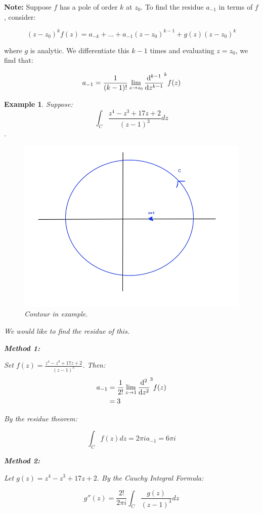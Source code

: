 \documentclass{article}
\newtheorem{ex}{Example}
\theoremstyle{definition}
\begin{document}
\textbf{Note:} Suppose $f$ has a pole of order $k$ at $z_0$. To find the residue $a_{-1}$ in terms of $f$, consider:

$$(z-z_0)^k f(z) = a_{-k}+...+a_{-1}(z-z_0)^{k-1}+ g(z)(z-z_0)^k$$

where $g$ is analytic. We differentiate this $k-1$ times and evaluating $z=z_0$, we find that:

$$a_{-1} = \frac{1}{(k-1)!} \lim_{z \to z_0} \dv{{}^{k-1}}{z^{k-1}} (z-z_0)^k f(z)$$

\begin{ex}
Suppose:
$$\int_C \frac{z^4-z^3+17z+2}{(z-1)^3}dz$$. 

\begin{figure}[H]
	\centering
	\includegraphics[width=0.5\linewidth]{contour_Ex}
	\caption{Contour in example.}
	\label{fig:contourex}
\end{figure}

We would like to find the residue of this. 

\textbf{Method 1:}

Set $f(z) =  \frac{z^4-z^3+17z+2}{(z-1)^3}$. Then:
\begin{align*}
a_{-1} &= \frac{1}{2!} \lim_{z\to1} \dv{^2}{z^2} (z-1)^3 f(z) \\ 
&= 3
\end{align*}

By the residue theorem:

$$\int_C f(z) dz = 2 \pi i  a_{-1} = 6 \pi i$$


\textbf{Method 2:}

Let $g(z) =  z^4-z^3+17z+2$. By the Cauchy Integral Formula:

$$g''(z) = \frac{2!}{2\pi i }\int_C \frac{g(z)}{(z-1)^3}dz$$
\end{ex}
\end{document}
